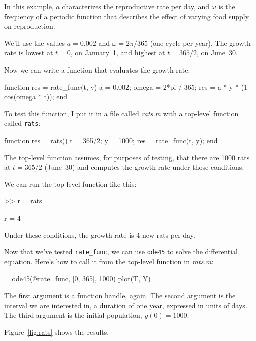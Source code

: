 
In this example, $a$ characterizes the reproductive rate per day, and
$\omega$ is the frequency of a periodic function that describes
the effect of varying food supply on reproduction.

We'll use the values $a = 0.002$
and $\omega = 2 \pi/365$ (one cycle per year).
The growth rate is lowest at $t=0$, on January~1, and highest at $t=365/2$, on June~30.

Now we can write a function that evaluates the growth rate:

\begin{code}
function res = rate_func(t, y)
    a = 0.002;
    omega = 2*pi / 365;
    res = a * y * (1 - cos(omega * t));
end
\end{code}

To test this function, I put it in a file called \emph{rats.m} with a top-level function called 
\lstinline{rats}:

\begin{code}
function res = rats()
    t = 365/2;
    y = 1000;
    res = rate_func(t, y);
end
\end{code}

The top-level function assumes, for purposes of testing, that
there are 1000 rats at $t=365/2$ (June~30) and computes the growth rate under those conditions.

We can run the top-level function like this:

\begin{code}
>> r = rats

r = 4
\end{code}

Under these conditions, the growth rate is 4 new rats per day. 

Now that we've tested \lstinline{rate_func}, we can use \lstinline{ode45} to solve the differential equation.
Here's how to call it from the top-level function in \emph{rats.m}:

\begin{code}
[T, Y] = ode45(@rate_func, [0, 365], 1000)
plot(T, Y)
\end{code}

The first argument is a function handle, again.  The second argument is the interval we are interested in, a duration of one year, expressed in units of days.
The third argument is the initial population, $y(0) = 1000$.


Figure~\ref{fig:rats} shows the results. 

